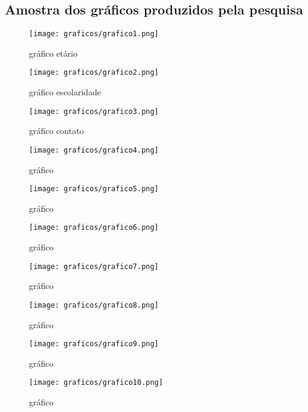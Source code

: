 \documentclass[
	article,			%
	12pt,				%
	oneside,			%
	a4paper,			%
	english,			%
	brazil,				%
	sumario=tradicional
	]{abntex2}
\begin{document}
\newpage
\begin{anexosenv}

\chapter{Amostra dos gráficos produzidos pela pesquisa}
\begin{figure}[h!]
\centering
\texttt{[image: graficos/grafico1.png]} %
\caption{gráfico etário}
\label{fig:grafico}
\end{figure}


\begin{figure}[h!]
\centering
\texttt{[image: graficos/grafico2.png]}
\caption{gráfico escolaridade}
\label{fig:grafico}
\end{figure}

\begin{figure}[h!]
\centering
\texttt{[image: graficos/grafico3.png]}
\caption{gráfico contato}
\label{fig:grafico}
\end{figure}

\begin{figure}[h!]
\centering
\texttt{[image: graficos/grafico4.png]}
\caption{gráfico }
\label{fig:grafico}
\end{figure}

\begin{figure}[h!]
\centering
\texttt{[image: graficos/grafico5.png]}
\caption{gráfico }
\label{fig:grafico}
\end{figure}

\begin{figure}[h!]
\centering
\texttt{[image: graficos/grafico6.png]}
\caption{gráfico }
\label{fig:grafico}
\end{figure}

\begin{figure}[h!]
\centering
\texttt{[image: graficos/grafico7.png]}
\caption{gráfico }
\label{fig:grafico}
\end{figure}

\begin{figure}[h!]
\centering
\texttt{[image: graficos/grafico8.png]}
\caption{gráfico }
\label{fig:grafico}
\end{figure}

\begin{figure}[h!]
\centering
\texttt{[image: graficos/grafico9.png]}
\caption{gráfico }
\label{fig:grafico}
\end{figure}

\begin{figure}[h!]
\centering
\texttt{[image: graficos/grafico10.png]}
\caption{gráfico }
\label{fig:grafico}
\end{figure}


\end{anexosenv}
\end{document}

